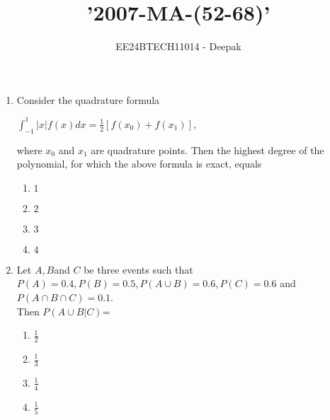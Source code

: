 \documentclass[journal]{IEEEtran}
\theoremstyle{remark}
\begin{document}

\onecolumn

\title{'2007-MA-(52-68)'}
\author{EE24BTECH11014 - Deepak }
\maketitle

\renewcommand{\thefigure}{\theenumi}
\renewcommand{\thetable}{\theenumi}

\begin{enumerate}


    \item Consider the quadrature formula 
    \begin{center}
        $\int_{-1}^{1}|x|f(x)dx=\frac{1}{2}[f(x_{0})+f(x_{1})],$ 
    \end{center}
            
            where $x_0$ and $x_1$ are quadrature points. Then the highest degree of the polynomial, for which the above formula is exact, equals
        
            \begin{multicols}{4}
            \begin{enumerate}
                \item $1$
                \item $2$
                \item $3$
                \item $4$
            \end{enumerate}
            \end{multicols}
            
                \item Let $A,B $and $C$ be three events such that\\
                $P(A)=0.4,P(B)=0.5,P(A\cup B)=0.6,P(C)=0.6$ and $P(A\cap B\cap C)=0.1$. \\
                Then $P(A\cup B|C)$=
                \begin{multicols}{4}
                \begin{enumerate}
                    \item $\frac{1}{2}$
                    \item $\frac{1}{3}$
                    \item $\frac{1}{4}$
                    \item $\frac{1}{5}$
                \end{enumerate}
                \end{multicols}


\end{enumerate}
\end{document}
